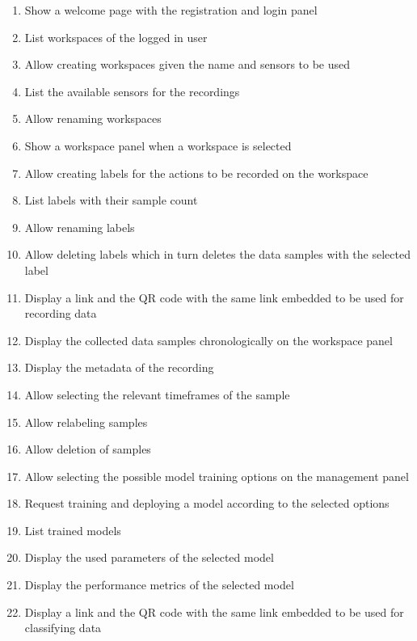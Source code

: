 \begin{enumerate}[{label = \textbf{/F{\protect\twodigits{\arabic{enumi}}}0/}, leftmargin = *}]
    \item \label{/F010/} Show a welcome page with the registration and login panel
    \item List workspaces of the logged in user
    \item Allow creating workspaces given the name and sensors to be used
    \item List the available sensors for the recordings
    \item Allow renaming workspaces
    \item Show a workspace panel when a workspace is selected
    \item Allow creating labels for the actions to be recorded on the workspace
    \item List labels with their sample count
    \item Allow renaming labels
    \item Allow deleting labels which in turn deletes the data samples with the selected label
    \item Display a link and the QR code with the same link embedded to be used for recording data
    \item Display the collected data samples chronologically on the workspace panel
    \item Display the metadata of the recording
    \item Allow selecting the relevant timeframes of the sample
    \item Allow relabeling samples
    \item Allow deletion of samples
    \item Allow selecting the possible model training options on the management panel 
    \item Request training and deploying a model according to the selected options
    \item List trained models
    \item Display the used parameters of the selected model
    \item Display the performance metrics of the selected model
    \item Display a link and the QR code with the same link embedded to be used for classifying data
\end{enumerate}

